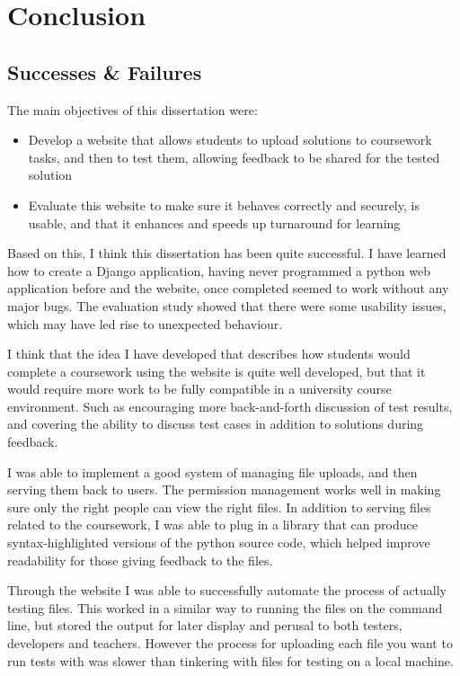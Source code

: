 \documentclass[a4paper,11pt]{report}
\begin{document}
\chapter{Conclusion}
\section{Successes \& Failures}
The main objectives of this dissertation were:
\begin{itemize}
\item Develop a website that allows students to upload solutions to coursework tasks, and then to test them, allowing feedback to be shared for the tested solution
\item Evaluate this website to make sure it behaves correctly and securely, is usable, and that it enhances  and speeds up turnaround for learning
\end{itemize}
Based on this, I think this dissertation has been quite successful. I have learned how to create a Django application, having never programmed a python web application before and the website, once completed seemed to work without any major bugs. The evaluation study showed that there were some usability issues, which may have led rise to unexpected behaviour.\par
I think that the idea I have developed that describes how students would complete a coursework using the website is quite well developed, but that it would require more work to be fully compatible in a university course environment. Such as encouraging more back-and-forth discussion of test results, and covering the ability to discuss test cases in addition to solutions during feedback.\par
I was able to implement a good system of managing file uploads, and then serving them back to users. The permission management works well in making sure only the right people can view the right files. In addition to serving files related to the coursework, I was able to plug in a library that can produce syntax-highlighted versions of the python source code, which helped improve readability for those giving feedback to the files.\par
Through the website I was able to successfully automate the process of actually testing files. This worked in a similar way to running the files on the command line, but stored the output for later display and perusal to both testers, developers and teachers. However the process for uploading each file you want to run tests with was slower than tinkering with files for testing on a local machine.\par
\end{document}
